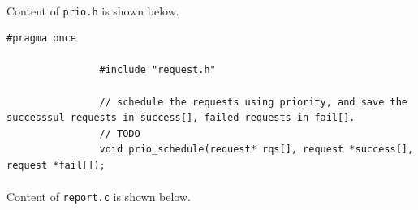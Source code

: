 \documentclass{article}
\begin{document}
            \paragraph{}
                Content of \texttt{prio.h} is shown below.
            \begin{Verbatim}[gobble=8]
                #pragma once

                #include "request.h"
                
                // schedule the requests using priority, and save the successsul requests in success[], failed requests in fail[].
                // TODO
                void prio_schedule(request* rqs[], request *success[], request *fail[]);
            \end{Verbatim}
            \paragraph{}
                Content of \texttt{report.c} is shown below.
\end{document}
